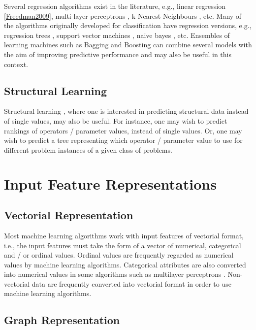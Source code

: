 \documentclass{article}
\begin{document}
Several regression algorithms exist in the literature, e.g., linear regression \ref{Freedman2009}, multi-layer perceptrons \cite{Bishop2006}, k-Nearest Neighbours \cite{MenziesEtAl2014}, etc.  Many of the algorithms originally developed for classification have regression versions, e.g., regression trees \cite{MenziesEtAl2014}, support vector machines \cite{ShaweTaylor2000}, naive bayes \cite{Bishop2006}, etc. Ensembles of learning machines such as Bagging \cite{Breiman1996} and Boosting \cite{Breiman1998} can combine several models with the aim of improving predictive performance and may also be useful in this context.

\subsection{Structural Learning}

Structural learning \cite{Baklr2007}, where one is interested in predicting structural data instead of single values, may also be useful. For instance, one may wish to predict rankings of operators / parameter values, instead of single values. Or, one may wish to predict a tree representing which operator / parameter value to use for different problem instances of a given class of problems. 

\section{Input Feature Representations}
\label{sec:input-features}

\subsection{Vectorial Representation}

Most machine learning algorithms work with input features of vectorial format, i.e., the input features must take the form of a vector of numerical, categorical and / or ordinal values. Ordinal values are frequently regarded as numerical values by machine learning algorithms. Categorical attributes are also converted into numerical values in some algorithms such as multilayer perceptrons \cite{Bishop2006}. Non-vectorial data are frequently converted into vectorial format in order to use machine learning algorithms.

\subsection{Graph Representation}
\end{document}
